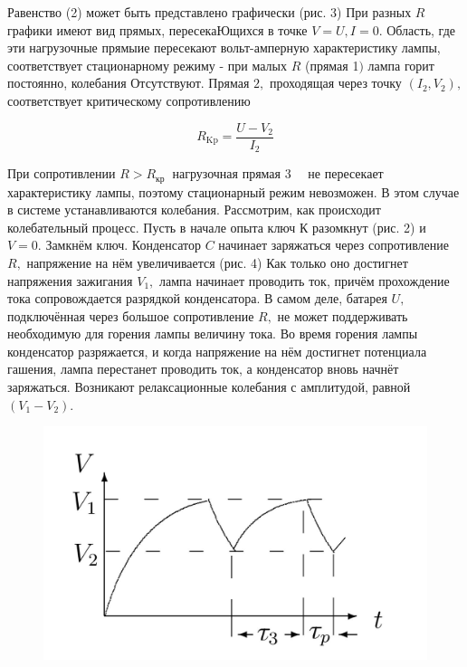 \documentclass[a4paper,12pt]{article} %
\begin{document}
Равенство (2) может быть представлено графически (рис. 3) При разных $R$ графики имеют вид прямых, пересекаЮщихся в точке $V=U, I=0 .$ Область, где эти нагрузочные прямыие пересекают вольт-амперную характеристику лампы, соответствует стационарному режиму - при малых $R$ (прямая 1$)$ лампа горит постоянно, колебания Отсутствуют. Прямая $2,$ проходящая через точку $\left(I_{2}, V_{2}\right),$ соответствует критическому сопротивлению

\begin{equation}
R_{\mathrm{Kp}}=\frac{U-V_{2}}{I_{2}}
\end{equation}

При сопротивлении $R>R_{\text {кр }}$ нагрузочная прямая $3 \quad$ не пересекает характеристику лампы, поэтому стационарный режим невозможен. В этом случае в системе устанавливаются колебания. Рассмотрим, как происходит колебательный процесс. Пусть в начале опыта ключ К разомкнут (рис. 2) и $V=0 .$ Замкнём ключ. Конденсатор $C$ начинает заряжаться через сопротивление $R,$ напряжение на нём увеличивается (рис. 4) Как только оно достигнет напряжения зажигания $V_{1},$ лампа начинает проводить ток, причём прохождение тока сопровождается разрядкой конденсатора. В самом деле, батарея $U,$ подключённая через большое сопротивление $R,$ не может поддерживать необходимую для горения лампы величину тока. Во время горения лампы конденсатор разряжается, и когда напряжение на нём достигнет потенциала гашения, лампа перестанет проводить ток, а конденсатор вновь начнёт заряжаться. Возникают релаксационные колебания с амплитудой, равной $\left(V_{1}-V_{2}\right) .$

\begin{figure} 
\begin{center}
\includegraphics[width=1\textwidth]{graph3.jpg}
\caption{}
\end{center}
\end{figure}
\end{document}
